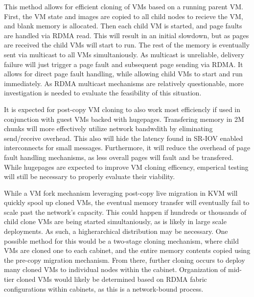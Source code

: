 This method allows for efficient cloning of VMs based on a running parent VM. First, the VM state and images are copied to all child nodes to recieve the VM, and blank memory is allocated. Then each child VM is started, and page faults are handled via RDMA read. This will result in an initial slowdown, but as pages are received the child VMs will start to run. The rest of the memory is eventually sent via multicast to all VMs simultaniously.   As multicast is unreliable, delivery failure will just trigger a page fault and subsequent page sending via RDMA.  It allows for direct page fault handling, while allowing child VMs to start and run immediately. As RDMA multicast mechanisms are relatively questionable,  more investigation is needed to evaluate the feasibility of this situation. %

It is expected for post-copy VM cloning to also work most efficiencly if used in conjunction with guest VMs backed with hugepages. Transfering memory in 2M chunks will more effectively utilize network bandwdith by eliminating send/receive overhead. This also will hide the latency found in SR-IOV enabled interconnects for small messages. Furthermore, it will reduce the overhead of page fault handling mechanisms, as less overall pages will fault and be transfered.  While hugepages are expected to improve VM cloning efficency, emperical testing will still be necessary to properly evaluate their viability.   

While a VM fork mechanism leveraging post-copy live migration in KVM will quickly spool up cloned VMs, the eventual memory transfer will eventually fail to scale past the network's capacity. This could happen if hundreds or thousands of child clone VMs are being started simultaniously, as is likely in large scale deployments. As such, a higherarchical distribution may be necessary. One possible method for this would be a two-stage cloning mechanism, where child VMs are cloned one to each cabinet, and the entire memory contents copied using the pre-copy migration mechanism. From there, further cloning occurs to deploy many cloned VMs to individual nodes within the cabinet. Organization of mid-tier cloned VMs would likely be determined based on RDMA fabric configurations within cabinets, as this is a network-bound process. 




